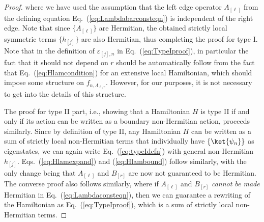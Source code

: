 \documentclass[prx,letterpaper,aps,superscriptaddress,floatfix,twocolumn,nofootinbib]{revtex4-2}
\theoremstyle{definition}
\begin{document}
\begin{proof}
where we have used the assumption that the left edge operator $A_{[\ell]}$ from the defining equation Eq.~(\ref{eq:Lambdabarconsteqn}) is independent of the right edge.
%
Note that since $\{ A_{[\ell]} \}$ are Hermitian, the obtained strictly local symmetric terms $\{h_{[j]}\}$ are also Hermitian, thus completing the proof for type I.
%
Note that in the definition of $\varepsilon_{[j],n}$ in Eq.~(\ref{eq:TypeIproof}), in particular the fact that it should not depend on $r$ should be automatically follow from the fact that Eq.~(\ref{eq:Hlamcondition}) for an extensive local Hamiltonian, which should impose some structure on $f_{n, \Lambda_{\ell, r}}$. However, for our purposes, it is not necessary to get into the details of this structure.
%

%
The proof for type II part,  i.e.,  showing that a Hamiltonian $H$ is type II if and only if its action can be written as a boundary non-Hermitian action,  proceeds similarly. 
%
Since by definition of type II, any Hamiltonian $H$ can be written as a sum of strictly local non-Hermitian terms that individually have $\{\ket{\psi_n}\}$ as eigenstates,  we can again write Eq.~(\ref{eq:typeIdefn}) with general non-Hermitian $h_{[j]}$. 
%
Eqs.~(\ref{eq:Hlamexpand}) and (\ref{eq:Hlambound}) follow similarly,  with the only change being that $A_{[\ell]}$ and $B_{[r]}$ are now not guaranteed to be Hermitian. 
%
The converse proof also follows similarly, where if $A_{[\ell]}$ and $B_{[r]}$ \textit{cannot be made} Hermitian in Eq.~(\ref{eq:Lambdaconsteqn}), then we can guarantee a rewriting of the Hamiltonian as Eq.~(\ref{eq:TypeIproof}),  which is a sum of strictly local non-Hermitian terms.
%
\end{proof}

%
\end{document}
